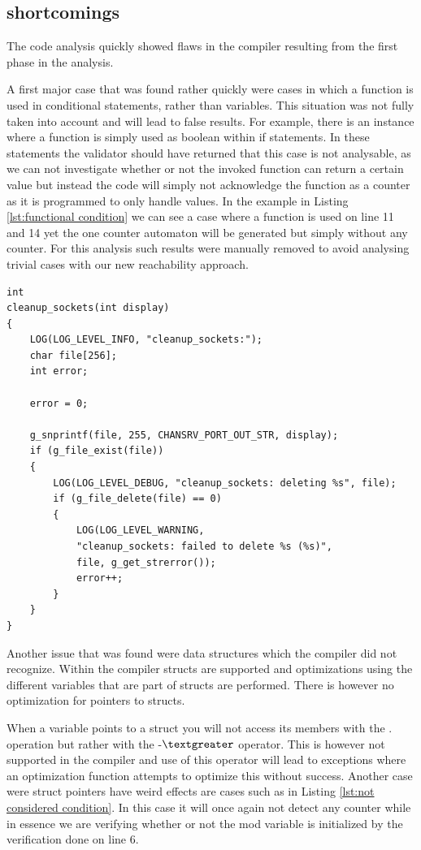 \documentclass[12pt]{article}
\begin{document}
\subsection{shortcomings}
The code analysis quickly showed flaws in the compiler resulting from the first phase in the analysis.

A first major case that was found rather quickly were cases in which a function is used in conditional statements, rather than variables. This situation was not fully taken into account and will lead to false results. For example, there is an instance where a function is simply used as boolean within if statements. In these statements the validator should have returned that this case is not analysable, as we can not investigate whether or not the invoked function can return a certain value but instead the code will simply not acknowledge the function as a counter as it is programmed to only handle values. In the example in Listing \ref{lst:functional condition} we can see a case where a function is used on line 11 and 14 yet the one counter automaton will be generated but simply without any counter. For this analysis such results were manually removed to avoid analysing trivial cases with our new reachability approach.

\begin{lstlisting}[style=CStyle,caption={Example of code using functions as conditional values}, label={lst:functional condition}]
int
cleanup_sockets(int display)
{
	LOG(LOG_LEVEL_INFO, "cleanup_sockets:");
	char file[256];
	int error;
	
	error = 0;
	
	g_snprintf(file, 255, CHANSRV_PORT_OUT_STR, display);
	if (g_file_exist(file))
	{
		LOG(LOG_LEVEL_DEBUG, "cleanup_sockets: deleting %s", file);
		if (g_file_delete(file) == 0)
		{
			LOG(LOG_LEVEL_WARNING,
			"cleanup_sockets: failed to delete %s (%s)",
			file, g_get_strerror());
			error++;
		}
	}
}
\end{lstlisting}

Another issue that was found were data structures which the compiler did not recognize. Within the compiler structs are supported and optimizations using the different variables that are part of structs are performed. There is however no optimization for pointers to structs. 

When a variable points to a struct you will not access its members with the . operation but rather with the -$\textgreater$ operator. This is however not supported in the compiler and use of this operator will lead to exceptions where an optimization function attempts to optimize this without success. Another case were struct pointers have weird effects are cases such as in Listing \ref{lst:not considered condition}. In this case it will once again not detect any counter while in essence we are verifying whether or not the mod variable is initialized by the verification done on line 6.
\end{document}
